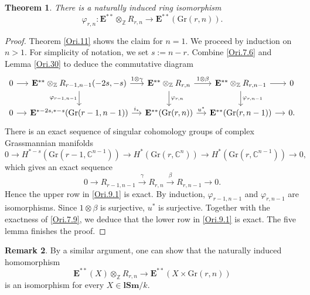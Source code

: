 \documentclass[11pt, a4paper]{amsart}
\newtheorem{thm}{Theorem}[subsection]
\theoremstyle{definition}
\newtheorem{rmk}[thm]{Remark}
\numberwithin{equation}{subsection}
\newcommand{\Z}{\mathbb{Z}}
\newcommand{\C}{\mathbb{C}}
\newcommand{\lSm}{\mathbf{lSm}}
\newcommand{\Gr}{{\mathrm{Gr}}}
\newcommand{\ringE}{\mathbf{E}}
\begin{document}
\begin{thm}
\label{Ori.9}
There is a naturally induced ring isomorphism
\[
\varphi_{r,n}
\colon
\ringE^{**}\otimes_{\Z}R_{r,n}
\to
\ringE^{**}(\Gr(r,n)).
\]
\end{thm}
\begin{proof}
Theorem \ref{Ori.11} shows the claim for $n=1$.
We proceed by induction on $n>1$. 
For simplicity of notation, we set $s:=n-r$.
Combine \eqref{Ori.7.6} and Lemma \ref{Ori.30} to deduce the commutative diagram
\begin{equation}
\label{Ori.9.1}
\begin{tikzcd}[column sep=small]
0\ar[r]&
\ringE^{**}\otimes_{\Z} R_{r-1,n-1}(-2s,-s)\ar[d,"\varphi_{r-1,n-1}"']\ar[r,"1\otimes \gamma"]&
\ringE^{**}\otimes_{\Z} R_{r,n}\ar[d,"\varphi_{r,n}"]\ar[r,"1\otimes \beta"]&
\ringE^{**}\otimes_{\Z} R_{r,n-1}\ar[d,"\varphi_{r,n-1}"]\ar[r]&
0
\\
0\ar[r]&
\ringE^{*-2s,*-s}(\Gr(r-1,n-1))\ar[r,"i_*"]&
\ringE^{**}(\Gr(r,n))\ar[r,"u^*"]&
\ringE^{**}(\Gr(r,n-1))\ar[r]&
0.
\end{tikzcd}
\end{equation}
There is an exact sequence of singular cohomology groups of complex Grassmannian manifolds
\[
0
\to
H^{*-s}(\Gr(r-1,\C^{n-1}))
\to
H^*(\Gr(r,\C^n))
\to
H^*(\Gr(r,\C^{n-1}))
\to
0,
\]
which gives an exact sequence
\[
0
\to
R_{r-1,n-1}
\xrightarrow{\gamma}
R_{r,n}
\xrightarrow{\beta}
R_{r,n-1}
\to
0.
\]
Hence the upper row in \eqref{Ori.9.1} is exact.
By induction, $\varphi_{r-1,n-1}$ and $\varphi_{r,n-1}$ are isomorphisms.
Since $1\otimes \beta$ is surjective, $u^*$ is surjective.
Together with the exactness of \eqref{Ori.7.9}, we deduce that the lower row in \eqref{Ori.9.1} is exact.
The five lemma finishes the proof.
\end{proof}

\begin{rmk}
\label{Ori.34}
By a similar argument, one can show that the naturally induced homomorphism
\begin{equation}
\label{Ori.34.1}
\ringE^{**}(X)\otimes_{\Z} R_{r,n}\to \ringE^{**}(X\times \Gr(r,n))
\end{equation}
is an isomorphism for every $X\in \lSm/k$.
\end{rmk}
\end{document}

